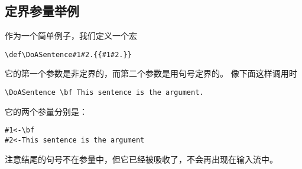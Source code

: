 \documentclass{book}
\begin{document}
\subsection{定界参量举例}

作为一个简单例子，我们定义一个宏
\begin{verbatim}
\def\DoASentence#1#2.{{#1#2.}}
\end{verbatim}
它的第一个参数是非定界的，而第二个参数是用句号定界的。
像下面这样调用时
\begin{verbatim}
\DoASentence \bf This sentence is the argument.
\end{verbatim}
它的两个参量分别是：
\begin{verbatim}
#1<-\bf
#2<-This sentence is the argument
\end{verbatim}
注意结尾的句号不在参量中，但它已经被吸收了，不会再出现在输入流中。

\end{document}

